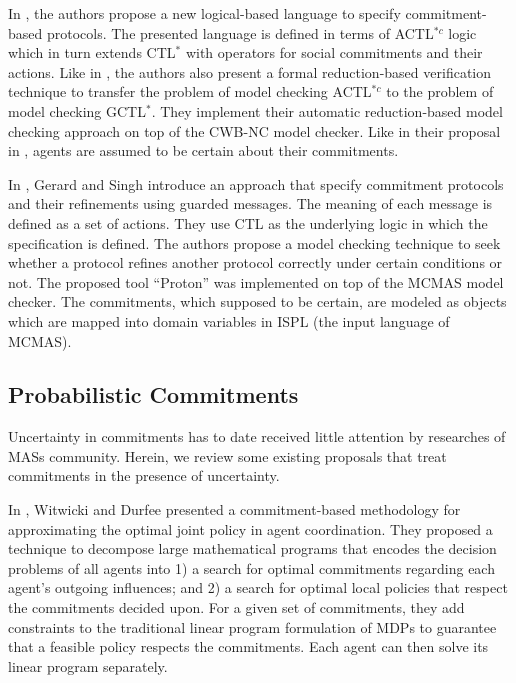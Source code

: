 In \cite{El-Menshawy2013b}, the authors propose a new
logical-based language to specify commitment-based protocols. The
presented language is defined in terms of ACTL$^{*c}$ logic which
in turn extends CTL$^*$ with operators for social commitments and
their actions. Like in \cite{El-Menshawy2013a}, the authors also
present a formal reduction-based verification technique to
transfer the problem of model checking ACTL$^{*c}$ to the problem
of model checking GCTL$^*$. They implement their automatic
reduction-based model checking approach on top of the CWB-NC model
checker. Like in their proposal in \cite{El-Menshawy2013a}, agents
are assumed to be certain about their commitments.

In \cite{Gerard2013}, Gerard and Singh introduce an approach that
specify commitment protocols and their refinements using guarded
messages. The meaning of each message is defined as a set of
actions. They use CTL as the underlying logic in which the
specification is defined. The authors propose a model checking
technique to seek whether a protocol refines another protocol
correctly under certain conditions or not. The proposed tool
``Proton'' was implemented on top of the MCMAS model checker. The
commitments, which supposed to be certain, are modeled as objects
which are mapped into domain variables in ISPL (the input language
of MCMAS).

\subsection{Probabilistic Commitments} \label{sec:related work PC}

Uncertainty in commitments has to date received little attention by researches of MASs community. Herein, we review some existing proposals that treat commitments in the presence of uncertainty.

In \cite{Witwicki2007}, Witwicki and Durfee presented a
commitment-based methodology for approximating the optimal joint
policy in agent coordination. They proposed a technique to
decompose large mathematical programs that encodes the decision
problems of all agents into 1) a search for optimal commitments
regarding each agent's outgoing influences; and 2) a search for
optimal local policies that respect the commitments decided upon.
For a given set of commitments, they add constraints to the
traditional linear program formulation of MDPs to guarantee that a
feasible policy respects the commitments. Each agent can then
solve its linear program separately.

